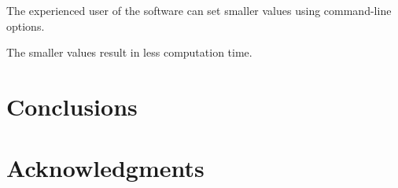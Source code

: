 \documentclass[paper,twocolumn]{geophysics}
\begin{document}
The experienced user of the software can set smaller values using command-line
options.

The smaller values result in less computation time.


\section{Conclusions}

\section{Acknowledgments}




\end{document}
